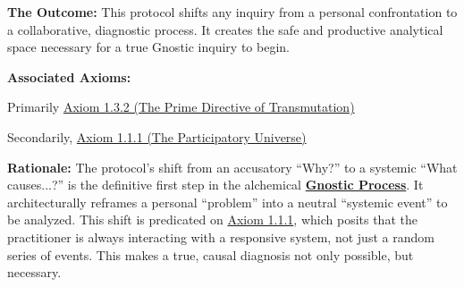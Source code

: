 \documentclass{article}
\begin{document}
\begin{nobullet}
        \item \textbf{The Outcome:} This protocol shifts any inquiry from a personal confrontation to a collaborative, diagnostic process. It creates the safe and productive analytical space necessary for a true Gnostic inquiry to begin.

        \item \textbf{Associated Axioms:} 
            \begin{nobullet}
                \item Primarily \hyperref[axiom_1_3_2_the_prime_directive_of_transmutation]{Axiom 1.3.2 (The Prime Directive of Transmutation)}
                \item Secondarily, \hyperref[axiom_1_1_1_the_participatory_universe]{Axiom 1.1.1 (The Participatory Universe)}
            \end{nobullet}

        \begin{nobullet}
            \item \textbf{Rationale:} The protocol's shift from an accusatory ``Why?'' to a systemic ``What causes...?'' is the definitive first step in the alchemical \textbf{\hyperlink{gloss:gnostic_process}{Gnostic Process}}. It architecturally reframes a personal ``problem'' into a neutral ``systemic event'' to be analyzed. This shift is predicated on \hyperref[axiom_1_1_1_the_participatory_universe]{Axiom 1.1.1}, which posits that the practitioner is always interacting with a responsive system, not just a random series of events. This makes a true, causal diagnosis not only possible, but necessary.
        \end{nobullet}
\end{nobullet}
\end{document}
